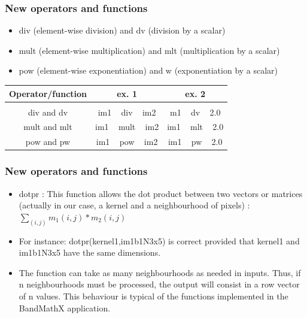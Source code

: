 \documentclass[8pt]{beamer}
\begin{document}
\begin{frame}
\frametitle{New operators and functions}


\begin{itemize}
\item div (element-wise division) and dv (division by a scalar)
\item mult (element-wise multiplication) and mlt (multiplication by a scalar)
\item pow (element-wise exponentiation) and w (exponentiation by a scalar)
\end{itemize}


\begin{center}
\begin{tabular}{c | c | c}
Operator/function & ex. 1 & ex. 2 \\
\hline \\
div and dv & im1 ~ div ~ im2 &  m1 ~ dv ~ 2.0 \\
mult and mlt & im1 ~  mult ~ im2 & im1 ~  mlt ~ 2.0  \\
pow and pw & im1 ~ pow ~ im2 & im1 ~ pw ~ 2.0
\end{tabular}
\end{center}


\end{frame}


\begin{frame}
\frametitle{New operators and functions}


\begin{itemize}
\item dotpr : This function allows the dot product between two vectors or matrices (actually in our case, a kernel and a neighbourhood of pixels) : $\sum_{(i,j)} m_1(i,j)*m_2(i,j)$


\item For instance: dotpr(kernel1,im1b1N3x5) is correct provided that kernel1 and im1b1N3x5 have the same dimensions. 
\item The function can take as many neighbourhoods as needed in inputs. Thus, if n neighbourhoods must be processed, the output will consist in a row vector of n values. This behaviour is typical of the functions implemented in the BandMathX application.
\end{itemize}

\end{frame}
\end{document}
